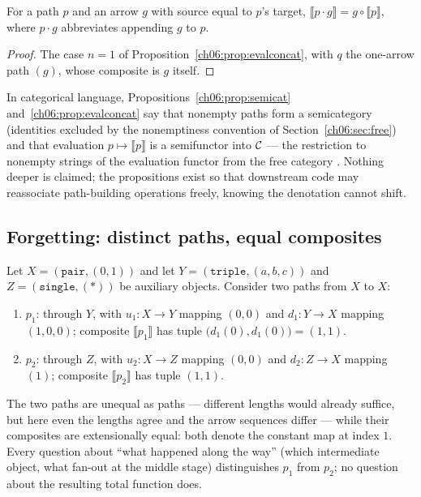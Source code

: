 \begin{lemma}
\label{ch06:lem:append}
For a path $p$ and an arrow $g$ with source equal to $p$'s target,
$\llbracket p \cdot g \rrbracket = g \circ \llbracket p \rrbracket$,
where $p \cdot g$ abbreviates appending $g$ to $p$.
\end{lemma}

\begin{proof}
The case $n = 1$ of Proposition~\ref{ch06:prop:evalconcat}, with $q$ the
one-arrow path $(g)$, whose composite is $g$ itself.
\end{proof}

In categorical language, Propositions~\ref{ch06:prop:semicat}
and~\ref{ch06:prop:evalconcat} say that nonempty paths form a
semicategory (identities excluded by the nonemptiness convention of
Section~\ref{ch06:sec:free}) and that evaluation
$p \mapsto \llbracket p \rrbracket$ is a semifunctor into $\mathcal{C}$ --- the
restriction to nonempty strings of the evaluation functor from the free
category \cite{maclanecwm}. Nothing deeper is claimed; the propositions
exist so that downstream code may reassociate path-building operations
freely, knowing the denotation cannot shift.

\subsection{Forgetting: distinct paths, equal composites}

\begin{example}
\label{ch06:ex:forgetting}
Let $X = (\texttt{pair}, (0, 1))$ and let
$Y = (\texttt{triple}, (a, b, c))$ and
$Z = (\texttt{single}, (\ast))$ be auxiliary objects. Consider two paths
from $X$ to $X$:
\begin{enumerate}
\item $p_1$: through $Y$, with $u_1 : X \to Y$ mapping $(0, 0)$ and
$d_1 : Y \to X$ mapping $(1, 0, 0)$; composite
$\llbracket p_1 \rrbracket$ has tuple
$\bigl(d_1(0), d_1(0)\bigr) = (1, 1)$.
\item $p_2$: through $Z$, with $u_2 : X \to Z$ mapping $(0, 0)$ and
$d_2 : Z \to X$ mapping $(1)$; composite $\llbracket p_2 \rrbracket$ has
tuple $(1, 1)$.
\end{enumerate}
The two paths are unequal as paths --- different lengths would already
suffice, but here even the lengths agree and the arrow sequences differ
--- while their composites are extensionally equal: both denote the
constant map at index $1$. Every question about ``what happened along the
way'' (which intermediate object, what fan-out at the middle stage)
distinguishes $p_1$ from $p_2$; no question about the resulting total
function does.
\end{example}

